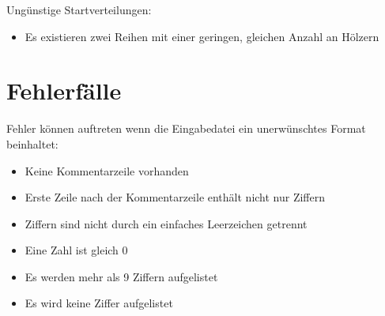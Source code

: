 Ungünstige Startverteilungen:

\begin{itemize}
\item{Es existieren zwei Reihen mit einer geringen, gleichen Anzahl an Hölzern}
\end{itemize}



\section{Fehlerfälle}
Fehler können auftreten wenn die Eingabedatei ein unerwünschtes Format beinhaltet:
\begin{itemize}
\item{Keine Kommentarzeile vorhanden}
\item{Erste Zeile nach der Kommentarzeile enthält nicht nur Ziffern}
\item{Ziffern sind nicht durch ein einfaches Leerzeichen getrennt}
\item{Eine Zahl ist gleich 0}
\item{Es werden mehr als 9 Ziffern aufgelistet}
\item{Es wird keine Ziffer aufgelistet}
\end{itemize}

